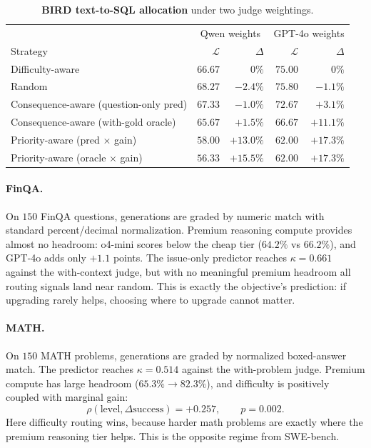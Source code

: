 \documentclass{article}
\begin{document}
\begin{table}[h]
\centering
\caption{\textbf{BIRD text-to-SQL allocation} under two judge weightings.}
\label{tab:ood-bird}
\small
\begin{tabular}{lrrrr}
\toprule
& \multicolumn{2}{c}{Qwen weights} & \multicolumn{2}{c}{GPT-4o weights} \\
Strategy & $\mathcal{L}$ & $\Delta$ & $\mathcal{L}$ & $\Delta$ \\
\midrule
Difficulty-aware & $66.67$ & $0\%$ & $75.00$ & $0\%$ \\
Random & $68.27$ & $-2.4\%$ & $75.80$ & $-1.1\%$ \\
Consequence-aware (question-only pred) & $67.33$ & $-1.0\%$ & $72.67$ & $+3.1\%$ \\
Consequence-aware (with-gold oracle) & $65.67$ & $+1.5\%$ & $66.67$ & $+11.1\%$ \\
Priority-aware (pred $\times$ gain) & $58.00$ & $+13.0\%$ & $62.00$ & $+17.3\%$ \\
Priority-aware (oracle $\times$ gain) & $\mathbf{56.33}$ & $\mathbf{+15.5\%}$ & $\mathbf{62.00}$ & $\mathbf{+17.3\%}$ \\
\bottomrule
\end{tabular}
\end{table}

\paragraph{FinQA.}
On $150$ FinQA questions, generations are graded by numeric match with
standard percent/decimal normalization. Premium reasoning compute
provides almost no headroom: o4-mini scores below the cheap tier
($64.2\%$ vs $66.2\%$), and GPT-4o adds only $+1.1$ points. The
issue-only predictor reaches $\kappa=0.661$ against the with-context
judge, but with no meaningful premium headroom all routing signals land
near random. This is exactly the objective's prediction: if upgrading
rarely helps, choosing where to upgrade cannot matter.

\paragraph{MATH.}
On $150$ MATH problems, generations are graded by normalized
boxed-answer match. The predictor reaches $\kappa=0.514$ against the
with-problem judge. Premium compute has large headroom
($65.3\%\to82.3\%$), and difficulty is positively coupled with
marginal gain:
\[
\rho(\mathrm{level},\Delta\mathrm{success})=+0.257,
\qquad p=0.002.
\]
Here difficulty routing wins, because harder math problems are exactly
where the premium reasoning tier helps. This is the opposite regime
from SWE-bench.
\end{document}
